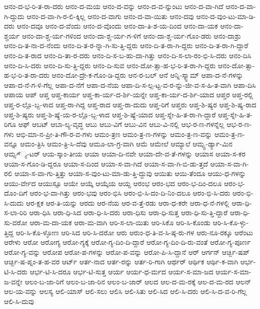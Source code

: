 {ಆನಂ-ದ-ಭ-ರಿ-ತ-ರಾ-ದರು
ಆನಂ-ದ-ಮಯ
ಆನಂ-ದ-ವನ್ನು
ಆನಂ-ದ-ವ-ನ್ನುಂಟು
ಆನಂ-ದ-ವಾ-ಗಿದೆ
ಆನಂ-ದ-ವಾ-ಗಿ-ದ್ದುದು
ಆನಂ-ದ-ವಾ-ಗಿ-ರ-ಲಿ-ಕ್ಕಿಲ್ಲ
ಆನಂ-ದ-ವಾಗು
ಆನಂ-ದ-ವಾ-ಯಿತು
ಆನಂ-ದವು
ಆನಂ-ದ-ವುಂ-ಟು-ಮಾ-ಡಿ-ದರು
ಆನಂ-ದವೂ
ಆನಂ-ದ-ವೆಂದು
ಆನಂ-ದ-ವೊಂದು
ಆನಂ-ದಾ-ತಿ-ಶ-ಯ-ದಿಂದ
ಆನಂ-ದಾ-ಯಕ
ಆನಂ-ದಾ-ಶ್ಚರ್ಯ
ಆನಂ-ದಾ-ಶ್ಚ-ರ್ಯ-ಗಳಿಂದ
ಆನಂ-ದಾ-ಶ್ಚ-ರ್ಯ-ಗ-ಳಿಗೆ
ಆನಂ-ದಾ-ಶ್ಚ-ರ್ಯ-ಗೊಂ-ಡರು
ಆನಂ-ದಾಶ್ರು
ಆನಂ-ದಿ-ತ-ನಾ-ದ-ನೆಂದು
ಆನಂ-ದಿ-ತ-ರ-ನ್ನಾ-ಗಿ-ಸು-ತ್ತಿ-ದ್ದರು
ಆನಂ-ದಿ-ತ-ರಾ-ಗಿ-ದ್ದರು
ಆನಂ-ದಿ-ತ-ರಾ-ಗಿ-ದ್ದಾರೆ
ಆನಂ-ದಿ-ತ-ರಾದ
ಆನಂ-ದಿ-ತಾ-ರ-ದರು
ಆನಂ-ದಿ-ಸ-ಬ-ಹು-ದಾ-ಗಿತ್ತು
ಆನಂ-ದಿ-ಸ-ಲಾ-ರಂ-ಭಿ-ಸಿ-ದರು
ಆನಂ-ದಿಸಿ
ಆನಂ-ದಿ-ಸಿ-ದರು
ಆನಂ-ದಿ-ಸು-ತ್ತಿ-ದ್ದರು
ಆನಂ-ದಿ-ಸುವ
ಆನಂ-ದೋ-ತ್ಸಾ-ಹ-ಭ-ರಿ-ತ-ರಾ-ಗಿ-ದ್ದರು
ಆನಂ-ದೋ-ತ್ಸಾ-ಹ-ಭ-ರಿ-ತ-ರಾ-ದರು
ಆನಂ-ದೋ-ದ್ರೇ-ಕ-ಗೊಂ-ಡಿ-ದ್ದರು
ಆನ-ರ-ಬಲ್
ಆನೆ
ಆನ್ನಿ-ಸ್ಕ್ವಾಮ್
ಆಪಾ-ದ-ನೆ-ಗಳನ್ನು
ಆಪಾ-ದ-ನೆ-ಗ-ಳಿ-ಗೆಲ್ಲ
ಆಪಾ-ದ-ನೆಗೆ
ಆಪಾ-ದ-ನೆಯ
ಆಪಾ-ದಿ-ಸ-ಲ್ಪ-ಟ್ಟ-ವ-ರ-ನ್ನು-ಜೀ-ವ-ಸ-ಹಿ-ತ-ವಾಗಿ
ಆಪಾ-ದಿಸಿ
ಆಪಾಯ
ಆಪ್
ಆಪ್ತ
ಆಪ್ತ-ಕಾರ್ಯ
ಆಪ್ತ-ಕಾ-ರ್ಯ-ದ-ರ್ಶಿ-ಯನ್ನೇ
ಆಪ್ತ-ಕಾ-ರ್ಯ-ದ-ರ್ಶಿ-ಯಾದ
ಆಪ್ತರ
ಆಪ್ತ-ರಲ್ಲಿ
ಆಪ್ತ-ರ-ಲ್ಲೊ-ಬ್ಬ-ಳಾದ
ಆಪ್ತ-ರಾ-ಗಿದ್ದ
ಆಪ್ತ-ರಾದ
ಆಪ್ತ-ರಾ-ದುದು
ಆಪ್ತ-ರಿಗೆ
ಆಪ್ತರು
ಆಪ್ತ-ಶಿ-ಷ್ಯರ
ಆಪ್ತ-ಶಿ-ಷ್ಯ-ರಾದ
ಆಪ್ತ-ಶಿ-ಷ್ಯರು
ಆಪ್ತ-ಶಿ-ಷ್ಯೆ-ಯ-ರ-ಲ್ಲೊ-ಬ್ಬ-ಳಾದ
ಆಪ್ತ-ಶಿ-ಷ್ಯೆ-ಯಾದ
ಆಪ್ತ-ಸ್ನೇ-ಹಿ-ತ-ರಾ-ಗಿ-ದ್ದಾರೆ
ಆಪ್ತ-ಸ್ನೇ-ಹಿ-ತ-ರಿಗೂ
ಆಫ್
ಆಬಟ್
ಆಬಾ-ಲ್ಯ-ವೃದ್ಧ
ಆಬು
ಆಬು-ವಿಗೆ
ಆಬು-ವಿನ
ಆಬು-ವಿ-ನಲ್ಲಿ
ಆಭ-ರ-ಣ-ಗಳನ್ನೆಲ್ಲ
ಆಭ-ರ-ಣ-ಗಳು
ಆಭಿ-ಮಾ-ನ-ಪ್ರೀ-ತಿ-ಗೌ-ರ-ವ-ಗಳು
ಆಮಂ-ತ್ರಣ
ಆಮಂ-ತ್ರ-ಣ-ಗಳನ್ನು
ಆಮಂ-ತ್ರ-ಣ-ವನ್ನು
ಆಮಂ-ತ್ರ-ಣ-ವನ್ನೂ
ಆಮಂ-ತ್ರಿಸಿ
ಆಮಂ-ತ್ರಿ-ಸಿ-ದೆವು
ಆಮೂ-ಲಾ-ಗ್ರ-ವಾಗಿ
ಆಮೆ
ಆಮೇಲೆ
ಆಮ್ಯಾಲೆ
ಆಮ್ಸ್ಟ-ರ್ಡ್ಯಾ-ಮಿನ
ಆಮ್ಸ-್್ಯ-ಟರ್
ಆಯ-ಸ್ಕಾಂ-ತೀಯ
ಆಯಾ
ಆಯಾ-ದಿ-ನವೇ
ಆಯಾ-ದೇ-ವ-ತೆ-ಗಳನ್ನು
ಆಯಾಸ
ಆಯಾ-ಸ-ಕರ
ಆಯಾ-ಸ-ಗೊಂ-ಡಿ-ದ್ದರೂ
ಆಯಾ-ಸ-ದಿಂದ
ಆಯಾ-ಸ-ವಾ-ಗಿದೆ
ಆಯಾ-ಸ-ವಾ-ಗಿ-ಬಿ-ಡು-ತ್ತದೆ
ಆಯಾ-ಸ-ವಾ-ಗಿ-ರಲಿ
ಆಯಾ-ಸ-ವಾ-ಗು-ತ್ತಿತ್ತು
ಆಯಾ-ಸ-ವುಂ-ಟು-ಮಾ-ಡು-ತ್ತಿ-ದ್ದುವು
ಆಯಿತು
ಆಯಿ-ತೆಂದೂ
ಆಯು-ಧ-ಗಳನ್ನು
ಆಯು-ರ್ವೇದ
ಆಯುಸ್ಸೂ
ಆಯೇ
ಆಯ್ಕೆ
ಆಯ್ಕೆಯ
ಆಯ್ದ
ಆರಂಭ
ಆರಂ-ಭದ
ಆರಂ-ಭ-ದಿಂ-ದಲೂ
ಆರಂ-ಭ-ದೊಂ-ದಿಗೆ
ಆರಂ-ಭ-ವಾ-ಗಿತ್ತು
ಆರಂ-ಭವು
ಆರಂ-ಭಿಸಿ
ಆರಂ-ಭಿ-ಸಿ-ದಂ-ದಿ-ನಿಂ-ದಲೂ
ಆರಂ-ಭಿ-ಸಿ-ದರು
ಆರಂ-ಭಿ-ಸಿ-ದುದು
ಆರ-ಕ್ಷಕ
ಆರ-ತಿ-ಯನ್ನು
ಆರದು
ಆರ-ನೆಯ
ಆರ-ವ-ತ್ತೆ-ರಡು
ಆರಾ-ಧ-ಕರೇ
ಆರಾ-ಧ-ನೆ-ಗಳಲ್ಲಿ
ಆರಾ-ಧಿ-ಸ-ಲಾ-ರಿರಿ
ಆರಾ-ಧಿಸಿ
ಆರಾ-ಧಿ-ಸಿದ
ಆರಾ-ಧಿ-ಸಿ-ದರು
ಆರಾ-ಧಿಸು
ಆರಾ-ಧಿ-ಸುತ್ತ
ಆರಾ-ಧಿ-ಸು-ತ್ತಿ-ದ್ದಾರೆ
ಆರಾ-ಧಿ-ಸು-ವರೋ
ಆರಾ-ಮ-ದಾ-ಯಕ
ಆರಾ-ಮ-ವಾಗಿ
ಆರಿ-ಸ-ಲಾ-ಯಿತು
ಆರಿ-ಸಿಕೊ
ಆರಿ-ಸಿ-ಕೊಂಡು
ಆರಿ-ಸಿ-ಕೊ-ಳ್ಳು-ತ್ತಿದ್ದ
ಆರಿ-ಸಿ-ಕೊ-ಳ್ಳೋಣ
ಆರಿ-ಸಿದ
ಆರಿ-ಸಿ-ದರೋ
ಆರು
ಆರುಂ-ಧ-ತಿ-ವ-ಸಿ-ಷ್ಠ-ರು-ಗಳ
ಆರು-ನೂ-ರಕ್ಕೂ
ಆರೆಂಟು
ಆರೇಳು
ಆರೋ
ಆರೋಗ್ಯ
ಆರೋ-ಗ್ಯಕ್ಕೆ
ಆರೋ-ಗ್ಯ-ದಿಂ-ದಿ-ದ್ದಾರೆ
ಆರೋ-ಗ್ಯ-ದಿಂ-ದಿ-ರು-ವಂತೆ
ಆರೋ-ಗ್ಯ-ಪೂರ್ಣ
ಆರೋ-ಗ್ಯ-ವನ್ನು
ಆರೋಪ
ಆರೋ-ಪ-ಗಳನ್ನು
ಆರೋ-ಪ-ವನ್ನು
ಆರೋ-ಪಿ-ಸಿ-ದ್ದಾನೆ
ಆರ್
ಆರ್ಗನ್
ಆರ್ಚ್ಬಿ-ಷಪ್
ಆರ್ಚ್ಬಿ-ಷ-ಪ್ನಂ-ತ-ಹ-ವರ
ಆರ್ಟ್
ಆರ್ತ-ನಾದ
ಆರ್ತ-ರನ್ನು
ಆರ್ತ-ರಿ-ಗಾಗಿ
ಆರ್ಥರ್
ಆರ್ಥಿಕ
ಆರ್ಥಿ-ಕ-ವಾಗಿ
ಆರ್ಭ-ಟಿ-ಸಿ-ದರು
ಆರ್ಭ-ಟಿ-ಸಿ-ದರೂ
ಆರ್ಭ-ಟಿ-ಸುತ್ತ
ಆರ್ಯ
ಆರ್ಯ-ಧ-ರ್ಮದ
ಆರ್ಯ-ಸ-ಮಾ-ಜದ
ಆರ್ಯ-ಸ-ಮಾ-ಜ-ವನ್ನೇ
ಆಲಂ-ಬ-ಜಾ-ರಿಗೆ
ಆಲಂ-ಬ-ಜಾ-ರಿನ
ಆಲಂ-ಬ-ಜಾರ್
ಆಲದ
ಆಲ-ದ-ಮ-ರಕ್ಕೆ
ಆಲ-ದ-ಮ-ರದ
ಆಲನ್
ಆಲ-ಯ-ವನ್ನು
ಆಲಸ್ಯ
ಆಲಿ-ಯಾಸ್
ಆಲಿ-ಸಲು
ಆಲಿಸಿ
ಆಲಿ-ಸಿತು
ಆಲಿ-ಸಿದ
ಆಲಿ-ಸಿ-ದರು
ಆಲಿ-ಸಿ-ದ-ವ-ರಿ-ಗೆಲ್ಲ
ಆಲಿ-ಸಿ-ದುವು
}
